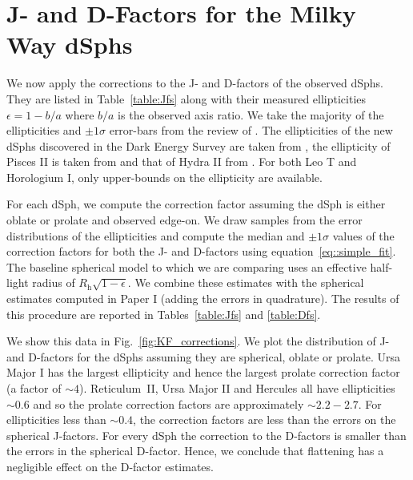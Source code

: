 \documentclass[prd,twocolumn,showpacs,preprintnumbers,superscriptaddress,nofootinbib,amsmath,amssymb,nobalancelastpage]{revtex4}
\begin{document}
\section{J- and D-Factors for the Milky Way dSphs}

We now apply the corrections to the J- and D-factors of the observed
dSphs. They are listed in Table~\ref{table:Jfs} along with their
measured ellipticities $\epsilon=1-b/a$ where $b/a$ is the observed
axis ratio. We take the majority of the ellipticities and $\pm1\sigma$
error-bars from the review of \cite{Mc12}. The ellipticities of the
new dSphs discovered in the Dark Energy Survey are taken from
\cite{Ko15}, the ellipticity of Pisces II is taken from \cite{Be10}
and that of Hydra II from \cite{Ma15}. For both Leo T and Horologium
I, only upper-bounds on the ellipticity are available.

For each dSph, we compute the correction factor assuming the dSph is
either oblate or prolate and observed edge-on. We draw samples from
the error distributions of the ellipticities and compute the median
and $\pm1\sigma$ values of the correction factors for both the J- and
D-factors using equation~\eqref{eq::simple_fit}. The baseline spherical model to which we are comparing uses an effective half-light radius of $R_\mathrm{h}\sqrt{1-\epsilon}$. We combine these estimates with the spherical estimates
computed in Paper I (adding the errors in quadrature). The results of
this procedure are reported in Tables~\ref{table:Jfs} and
\ref{table:Dfs}.

We show this data in Fig.~\ref{fig:KF_corrections}. We plot the
distribution of J- and D-factors for the dSphs assuming they are
spherical, oblate or prolate. Ursa Major I has the largest ellipticity
and hence the largest prolate correction factor (a factor of
$\sim4$). Reticulum~II, Ursa Major II and Hercules all have ellipticities
$\sim0.6$ and so the prolate correction factors are approximately
$\sim2.2-2.7$. For ellipticities less than $\sim0.4$, the correction
factors are less than the errors on the spherical J-factors. For every
dSph the correction to the D-factors is smaller than the errors in
the spherical D-factor. Hence, we conclude that flattening has a
negligible effect on the D-factor estimates.
\end{document}
